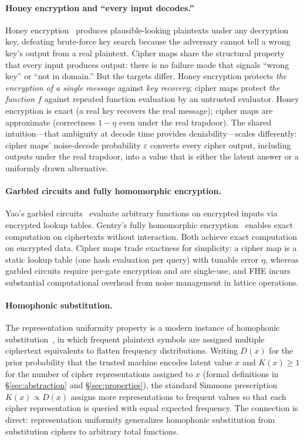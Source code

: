 \documentclass[11pt]{article}
\theoremstyle{definition}
\theoremstyle{plain}
\theoremstyle{remark}
\begin{document}
\paragraph{Honey encryption and ``every input decodes.''}
Honey encryption~\cite{juels2014honey} produces plausible-looking
plaintexts under any decryption key, defeating brute-force key search
because the adversary cannot tell a wrong key's output from a real
plaintext.  Cipher maps share the structural property that every input
produces output: there is no failure mode that signals ``wrong key'' or
``not in domain.''  But the targets differ.  Honey encryption protects
\emph{the encryption of a single message} against \emph{key recovery};
cipher maps protect \emph{the function $f$} against repeated function
evaluation by an untrusted evaluator.  Honey encryption is exact (a real
key recovers the real message); cipher maps are approximate (correctness
$1 - \eta$ even under the real trapdoor).  The shared intuition---that
ambiguity at decode time provides deniability---scales differently:
cipher maps' noise-decode probability $\varepsilon$ converts every cipher
output, including outputs under the real trapdoor, into a value that is
either the latent answer or a uniformly drawn alternative.

\paragraph{Garbled circuits and fully homomorphic encryption.}
Yao's garbled circuits~\cite{yao1982protocols} evaluate arbitrary functions
on encrypted inputs via encrypted lookup tables.  Gentry's fully homomorphic
encryption~\cite{gentry2009fully} enables exact computation on ciphertexts
without interaction.  Both achieve exact computation on encrypted data.
Cipher maps trade exactness for simplicity: a cipher map is a static lookup
table (one hash evaluation per query) with tunable error $\eta$, whereas
garbled circuits require per-gate encryption and are single-use, and FHE
incurs substantial computational overhead from noise management in lattice
operations.

\paragraph{Homophonic substitution.}
The representation uniformity property is a modern instance of
homophonic substitution~\cite{simmons1979symmetric}, in which frequent
plaintext symbols are assigned multiple ciphertext equivalents to
flatten frequency distributions.  Writing $D(x)$ for the prior
probability that the trusted machine encodes latent value $x$ and
$K(x) \geq 1$ for the number of cipher representations assigned to $x$
(formal definitions in \S\ref{sec:abstraction} and
\S\ref{sec:properties}), the standard Simmons prescription
$K(x) \propto D(x)$ assigns more representations to frequent values so
that each cipher representation is queried with equal expected
frequency.  The connection is direct: representation uniformity
generalizes homophonic substitution from substitution ciphers to
arbitrary total functions.
\end{document}
